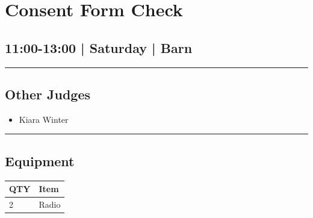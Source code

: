\documentclass[10pt, A5]{article}
\begin{document}
        \begin{framed}
        \begin{minipage}{\textwidth}

        \setcounter{section}{7}
        \section{Consent Form Check}
        \subsection*{11:00-13:00 | Saturday | Barn}

        \vspace{0.25cm}
        \hrule
        \vspace{0.25cm}


        \subsection*{Other Judges}
                    

        	\begin{multicols}{2}

		\begin{itemize}
									\item Kiara Winter
						\end{itemize}

		\vfill\null
		\columnbreak

		\begin{itemize}
						\end{itemize}

		\vfill\null

		\end{multicols}

    \vspace{0.25cm}
        \hrule
        \vspace{0.25cm}

        \begin{multicols}{2}

		\section*{\faWrench \: Equipment}

		
	\begin{center}
			\begin{tabular}{p{2cm}p{4cm}}


				\textbf{QTY} & \textbf{Item} \\\toprule
												2&Radio\\\midrule
								\end{tabular}


\end{center}
\end{multicols}
\end{minipage}
\end{framed}
\end{document}
